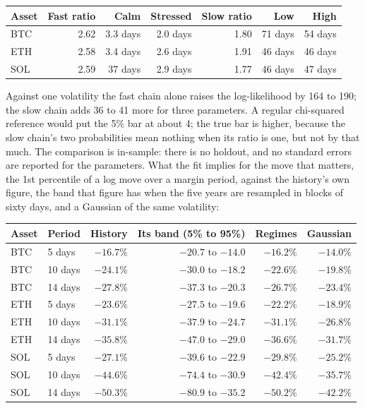 \documentclass[11pt,a4paper]{article}
\begin{document}
\begin{longtable}{l r r r r r r}
\toprule
Asset & Fast ratio & Calm & Stressed & Slow ratio & Low & High\\
\midrule
\endhead
BTC & 2.62 & 3.3 days & 2.0 days & 1.80 & 71 days & 54 days \\
ETH & 2.58 & 3.4 days & 2.6 days & 1.91 & 46 days & 46 days \\
SOL & 2.59 & 37 days & 2.9 days & 1.77 & 46 days & 47 days \\
\bottomrule
\end{longtable}

Against one volatility the fast chain alone raises the log-likelihood by 164 to 190; the slow chain adds 36 to 41 more for three parameters. A regular chi-squared reference would put the 5\% bar at about 4; the true bar is higher, because the slow chain's two probabilities mean nothing when its ratio is one, but not by that much. The comparison is in-sample: there is no holdout, and no standard errors are reported for the parameters. What the fit implies for the move that matters, the 1st percentile of a log move over a margin period, against the history's own figure, the band that figure has when the five years are resampled in blocks of sixty days, and a Gaussian of the same volatility:

\begin{longtable}{l l r r r r}
\toprule
Asset & Period & History & Its band (5\% to 95\%) & Regimes & Gaussian\\
\midrule
\endhead
BTC & 5 days & $-16.7\%$ & $-20.7$ to $-14.0$ & $-16.2\%$ & $-14.0\%$ \\
BTC & 10 days & $-24.1\%$ & $-30.0$ to $-18.2$ & $-22.6\%$ & $-19.8\%$ \\
BTC & 14 days & $-27.8\%$ & $-37.3$ to $-20.3$ & $-26.7\%$ & $-23.4\%$ \\
ETH & 5 days & $-23.6\%$ & $-27.5$ to $-19.6$ & $-22.2\%$ & $-18.9\%$ \\
ETH & 10 days & $-31.1\%$ & $-37.9$ to $-24.7$ & $-31.1\%$ & $-26.8\%$ \\
ETH & 14 days & $-35.8\%$ & $-47.0$ to $-29.0$ & $-36.6\%$ & $-31.7\%$ \\
SOL & 5 days & $-27.1\%$ & $-39.6$ to $-22.9$ & $-29.8\%$ & $-25.2\%$ \\
SOL & 10 days & $-44.6\%$ & $-74.4$ to $-30.9$ & $-42.4\%$ & $-35.7\%$ \\
SOL & 14 days & $-50.3\%$ & $-80.9$ to $-35.2$ & $-50.2\%$ & $-42.2\%$ \\
\bottomrule
\end{longtable}
\end{document}
